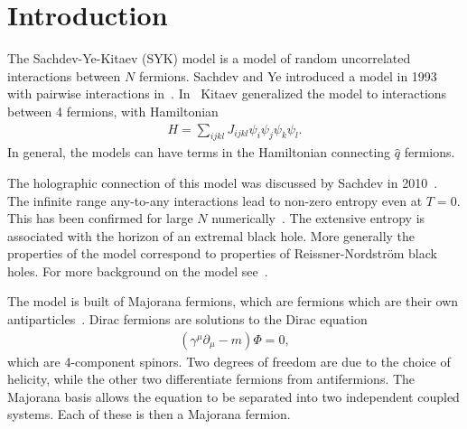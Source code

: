 \documentclass[12pt]{article} %
\begin{document}
\section{Introduction} \label{sec:intro}

The Sachdev-Ye-Kitaev (SYK) model is a model of random uncorrelated interactions between $N$ fermions. Sachdev and Ye introduced a model in 1993 with pairwise interactions in~\cite{sachdev93}. In~\cite{kitaev15} Kitaev generalized the model to interactions between 4 fermions, with Hamiltonian
\begin{align}
H = \sum_{ijkl}J_{ijkl}\psi_i\psi_j\psi_k\psi_l.
\end{align} 
In general, the models can have terms in the Hamiltonian connecting $\hat{q}$ fermions. 

The holographic connection of this model was discussed by Sachdev in 2010~\cite{sachdev10}. The infinite range any-to-any interactions lead to non-zero entropy even at $T=0$. This has been confirmed for large $N$ numerically~\cite{Georges2001}. The extensive entropy is associated with the horizon of an extremal black hole. More generally the properties of the model correspond to properties of  Reissner-Nordstr\"om black holes. For more background on the model see~\cite{mald16}.

The model is built of Majorana fermions, which are fermions which are their own antiparticles~\cite{elliott14}. Dirac fermions are solutions to the Dirac equation
\begin{align}
(\gamma^\mu\partial_\mu - m)\Phi = 0,
\end{align}
which are 4-component spinors. Two degrees of freedom are due to the choice of helicity, while the other two differentiate fermions from antifermions. The Majorana basis allows the equation to be separated into two independent coupled systems. Each of these is then a Majorana fermion. 
\end{document}
